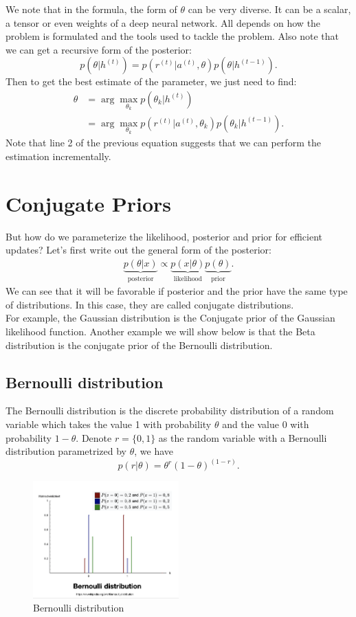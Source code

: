 \documentclass[11pt]{article}
\begin{document}
We note that in the formula, the form of $\theta$ can be very diverse. It can be a scalar, a tensor or even weights of a deep neural network. All depends on how the problem is formulated and the tools used to tackle the problem. Also note that we can get a recursive form of the posterior:
\[ p(\theta | h^{(t)}) = p(r^{(t)}| a^{(t)},\theta) p(\theta | h^{(t-1)}). \]
Then to get the best estimate of the parameter, we just need to find:
\begin{align*}
    \widehat{\theta} &= \arg\max_{\theta_k} p(\theta_k | h^{(t)})\\
    &= \arg\max_{\theta_k} p(r^{(t)}| a^{(t)},\theta_k) p(\theta_k | h^{(t-1)}).
\end{align*}
Note that line 2 of the previous equation suggests that we can perform the estimation incrementally.

\section{Conjugate Priors}
But how do we parameterize the likelihood, posterior and prior for efficient updates? Let's first write out the general form of the posterior:
\begin{align*}
    \underbrace{p(\theta | x)}_{\text{posterior}} \propto \underbrace{p(x|\theta)}_{\text{likelihood}} \underbrace{p(\theta)}_{\text{prior}}.
\end{align*}
We can see that it will be favorable if posterior and the prior have the same type of distributions. In this case, they are called conjugate distributions.\\
For example, the Gaussian distribution is the Conjugate prior of the Gaussian likelihood function. Another example we will show below is that the Beta distribution is the conjugate prior of the Bernoulli distribution.
\subsection{Bernoulli distribution}
The Bernoulli distribution is the discrete probability distribution of a random variable which takes the value 1 with probability $\theta$ and the value 0 with probability $1-\theta$. Denote $r = \{0,1\}$ as the random variable with a Bernoulli distribution parametrized by $\theta$, we have 
\[p(r|\theta) = \theta^r (1-\theta)^(1-r).\]
\begin{figure}[t]
    \centering
    \includegraphics[width=0.5\textwidth]{figure/bernoulli.png}
    \caption{Bernoulli distribution}
    \label{fig:bernoulli}
\end{figure}
\end{document}
